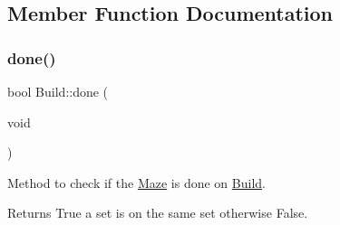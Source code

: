\subsection{Member Function Documentation}
\mbox{\label{classBuild_a72373ff38b0676c8f2c9f171c15333c4}} 
\subsubsection{\texorpdfstring{done()}{done()}}
{\footnotesize\ttfamily bool Build\+::done (\begin{DoxyParamCaption}\item[{void}]{ }\end{DoxyParamCaption})}



Method to check if the \hyperlink{classMaze}{Maze} is done on \hyperlink{classBuild}{Build}. 

\begin{DoxyReturn}{Returns}
True a set is on the same set otherwise False. 
\end{DoxyReturn}

